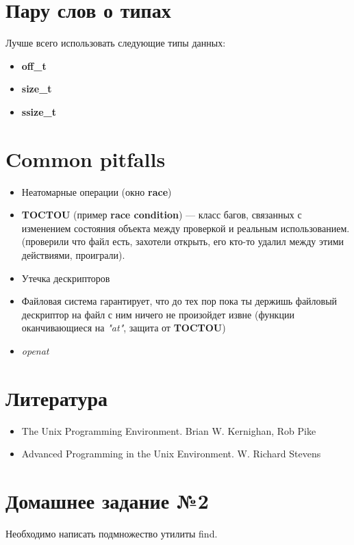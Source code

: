 \documentclass[../../lectures.tex]{subfiles}
\begin{document}
\section{Пару слов о типах}
Лучше всего использовать следующие типы данных:

\begin{itemize}
    \item \textbf{off\_t}
    \item \textbf{size\_t}
    \item \textbf{ssize\_t}
\end{itemize}


\section{Common pitfalls}
\begin{itemize}
    \item Неатомарные операции (окно \textbf{race})
    \item \textbf{TOCTOU} (пример \textbf{race condition}) --- класс багов, связанных
          с изменением состояния объекта между проверкой и реальным использованием.
          (проверили что файл есть, захотели открыть, его кто-то удалил между этими действиями,
          проиграли).
    \item Утечка дескрипторов
    \item Файловая система гарантирует, что до тех пор пока 
          ты держишь файловый дескриптор на файл с ним ничего 
          не произойдет извне (функции оканчивающиеся на \emph{"at"}, 
          защита от \textbf{TOCTOU})
    \item \emph{openat}
\end{itemize}

\section{Литература}
\begin{itemize}
    \item The Unix Programming Environment. Brian W. Kernighan, Rob Pike
    \item Advanced Programming in the Unix Environment. W. Richard Stevens
\end{itemize}

\section{Домашнее задание №2}
Необходимо написать подмножество утилиты find.
\end{document}

